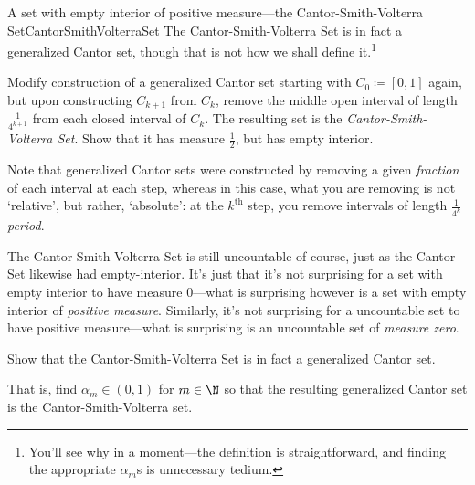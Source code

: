 \begin{exm}{A set with empty interior of positive measure---the Cantor-Smith-Volterra Set}{CantorSmithVolterraSet}
The Cantor-Smith-Volterra Set is in fact a generalized Cantor set, though that is not how we shall define it.\footnote{You'll see why in a moment---the definition is straightforward, and finding the appropriate $\alpha _m$s is unnecessary tedium.}
\begin{exr}{}{}
Modify construction of a generalized Cantor set starting with $C_0\coloneqq [0,1]$ again, but upon constructing $C_{k+1}$ from $C_k$, remove the middle open interval of length $\frac{1}{4^{k+1}}$ from each closed interval of $C_k$.  The resulting set is the \emph{Cantor-Smith-Volterra Set}.  Show that it has measure $\frac{1}{2}$, but has empty interior.
\end{exr}
\begin{rmk}
Note that generalized Cantor sets were constructed by removing a given \emph{fraction} of each interval at each step, whereas in this case, what you are removing is not `relative', but rather, `absolute':  at the $k^{\text{th}}$ step, you remove intervals of length $\frac{1}{4^k}$ \emph{period}.
\end{rmk}
\begin{rmk}
The Cantor-Smith-Volterra Set is still uncountable of course, just as the Cantor Set likewise had empty-interior.  It's just that it's not surprising for a set with empty interior to have measure $0$---what is surprising however is a set with empty interior of \emph{positive measure}.  Similarly, it's not surprising for a uncountable set to have positive measure---what is surprising is an uncountable set of \emph{measure zero}.
\end{rmk}
\begin{exr}{}{}
Show that the Cantor-Smith-Volterra Set is in fact a generalized Cantor set.
\begin{rmk}
That is, find $\alpha _m\in (0,1)$ for $m\in \N$ so that the resulting generalized Cantor set is the Cantor-Smith-Volterra set.
\end{rmk}
\end{exr}
\end{exm}

\horizontalrule

